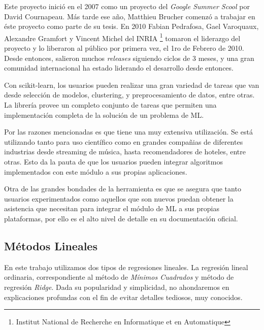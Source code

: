   \par Este proyecto inició en el 2007 como un proyecto del \textit{Google Summer Scool} por David
    Cournapeau. Más tarde ese año, Matthieu Brucher comenzó a trabajar en éste proyecto
    como parte de su tesis. En 2010 Fabian Pedrafosa, Gael Varoquaux, Alexandre
    Gramfort y Vincent Michel del INRIA \footnote{Institut National de Recherche
    en Informatique et en Automatique} tomaron el liderazgo del proyecto y lo liberaron
    al público por primera vez, el 1ro de Febrero de 2010. Desde entonces, salieron muchos
    \textit{releases} siguiendo ciclos de 3 meses, y una gran comunidad internacional
    ha estado liderando el desarrollo desde entonces.

  \par Con scikit-learn, los usuarios pueden realizar una gran variedad de tareas
    que van desde selección de modelos, clustering, y preprocesamiento de datos, entre otras.
    La librería provee un completo conjunto de tareas que permiten una
    implementación completa de la solución de un problema de ML.

  \par Por las razones mencionadas es que tiene una muy extensiva utilización.
    Se está utilizando tanto para uso científico como en
    grandes compañias de diferentes industrias desde streaming de música, hasta
    recomendadores de hoteles, entre otras. Esto da la pauta de que los usuarios pueden
    integrar algoritmos implementados con este módulo a sus propias aplicaciones.

  \par Otra de las grandes bondades de la herramienta es que se asegura que
    tanto usuarios experimentados como aquellos que son nuevos puedan obtener
    la asistencia que necesitan para integrar el módulo de ML a sus propias
    plataformas, por ello es el alto nivel de detalle en su documentación oficial.



\subsection{Métodos Lineales}

  \par En este trabajo utilizamos dos tipos de regresiones lineales. La regresión
  lineal ordinaria, correspondiente al método de \textit{Mínimos Cuadrados}\cite{least_square}
  y método de regresión \textit{Ridge}\cite{ridge}.
  Dada su popularidad y simplicidad, no ahondaremos en explicaciones profundas
  con el fin de evitar detalles tediosos, muy conocidos.


